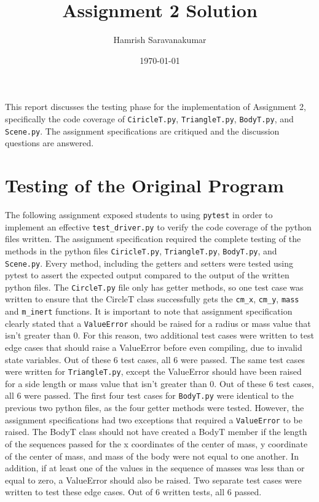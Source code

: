 \documentclass[12pt]{article}
\title{Assignment 2 Solution}
\author{Hamrish Saravanakumar}
\date{\today}
\begin{document}
\maketitle
This report discusses the testing phase for the implementation of Assignment 2, specifically the code coverage of \texttt{CiricleT.py}, \texttt{TriangleT.py}, \texttt{BodyT.py}, and \texttt{Scene.py}. The assignment specifications are critiqued and the discussion questions are answered.

\section{Testing of the Original Program}

The following assignment exposed students to using \texttt{pytest} in order to implement an effective \texttt{test\_driver.py} to verify the code coverage of the python files written. The assignment specification required the complete testing of the methods in the python files \texttt{CiricleT.py}, \texttt{TriangleT.py}, \texttt{BodyT.py}, and \texttt{Scene.py}. Every method, including the getters and setters were tested using pytest to assert the expected output compared to the output of the written python files. 
\newline
\newline
The \texttt{CircleT.py} file only has getter methods, so one test case was written to ensure that the CircleT class successfully gets the \texttt{cm\_x}, \texttt{cm\_y}, \texttt{mass} and \texttt{m\_inert} functions. It is important to note that assignment specification clearly stated that a \texttt{ValueError} should be raised for a radius or mass value that isn't greater than 0. For this reason, two additional test cases were written to test edge cases that should raise a ValueError before even compiling, due to invalid state variables. Out of these 6 test cases, all 6 were passed. 
The same test cases were written for \texttt{TriangleT.py}, except the ValueError should have been raised for a side length or mass value that isn't greater than 0. Out of these 6 test cases, all 6 were passed. 
\newpage
The first four test cases for \texttt{BodyT.py} were identical to the previous two python files, as the four getter methods were tested. However, the assignment specifications had two exceptions that required a \texttt{ValueError} to be raised. The BodyT class should not have created a BodyT member if the length of the sequences passed for the x coordinates of the center of mass, y coordinate of the center of mass, and mass of the body were not equal to one another. In addition, if at least one of the values in the sequence of masses was less than or equal to zero, a ValueError should also be raised. Two separate test cases were written to test these edge cases. Out of 6 written tests, all 6 passed.
\end{document}
